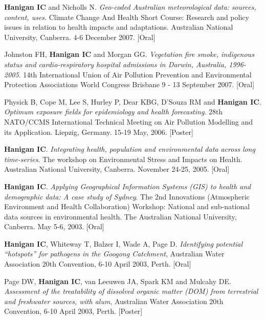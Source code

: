 \documentclass[a4paper,11pt]{article}
\begin{document}
\begin{revnumerate}
\item \textbf{Hanigan IC} and Nicholls N. \emph{Geo-coded Australian meteorological data: sources, content, uses}. Climate Change And Health Short Course: Research and policy issues in relation to health impacts and adaptations.  Australian National University, Canberra. 4-6 December 2007. [Oral]

\item Johnston FH, \textbf{Hanigan IC} and Morgan GG. \emph{Vegetation fire smoke, indigenous status and cardio-respiratory hospital admissions in Darwin, Australia, 1996-2005}. 14th International Union of Air Pollution Prevention and Environmental Protection Associations World Congress Brisbane 9 - 13 September 2007. [Oral]

\item Physick B, Cope M, Lee S, Hurley P, Dear KBG, D’Souza RM and \textbf{Hanigan IC}. \emph{Optimum exposure fields for epidemiology and health forecasting}. 28th NATO/CCMS International Technical Meeting on Air Pollution Modelling and its Application. Liepzig, Germany. 15-19 May, 2006. [Poster]

\item \textbf{Hanigan IC}. \emph{Integrating health, population and environmental data across long time-series}. The workshop on Environmental Stress and Impacts on Health. Australian National University, Canberra. November 24-25, 2005. [Oral]

\item \textbf{Hanigan IC}. \emph{Applying Geographical Information Systems (GIS) to health and demographic data: A case study of Sydney}. The 2nd Innovations (Atmospheric Environment and Health Collaboration) Workshop: National and sub-national data sources in environmental health. The Australian National University, Canberra. May 5-6, 2003. [Oral]

\item \textbf{Hanigan IC}, Whiteway T, Balzer I, Wade A, Page D. \emph{Identifying potential “hotspots” for pathogens in the Googong Catchment}, Australian Water Association 20th Convention, 6-10 April 2003, Perth. [Oral]

\item Page DW, \textbf{Hanigan IC}, van Leeuwen JA, Spark KM and Mulcahy DE.  \emph{Assessment of the treatability of dissolved organic matter (DOM) from terrestrial and freshwater sources, with alum}, Australian Water Association 20th Convention, 6-10 April 2003, Perth. [Poster]


\end{revnumerate}
\end{document}
